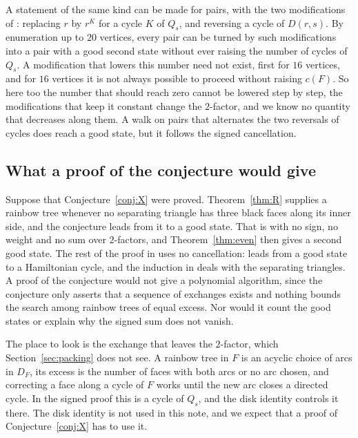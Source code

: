 \documentclass[10pt]{amsart}
\numberwithin{equation}{section}
\theoremstyle{definition}
\theoremstyle{remark}
\begin{document}
A statement of the same kind can be made for pairs, with the two modifications of \cite[Sections~5 and~6]{Paper}: replacing $r$ by $r^K$ for a cycle $K$ of $Q_s$, and reversing a cycle of $D(r,s)$.
By enumeration up to $20$ vertices, every pair can be turned by such modifications into a pair with a good second state without ever raising the number of cycles of $Q_s$.
A modification that lowers this number need not exist, first for $16$ vertices, and for $16$ vertices it is not always possible to proceed without raising $c(F)$.
So here too the number that should reach zero cannot be lowered step by step, the modifications that keep it constant change the $2$-factor, and we know no quantity that decreases along them.
A walk on pairs that alternates the two reversals of cycles does reach a good state, but it follows the signed cancellation.

\subsection*{What a proof of the conjecture would give}
Suppose that Conjecture~\ref{conj:X} were proved.
Theorem~\ref{thm:R} supplies a rainbow tree whenever no separating triangle has three black faces along its inner side, and the conjecture leads from it to a good state.
That is \cite[Proposition~6.9]{Paper} with no sign, no weight and no sum over $2$-factors, and Theorem~\ref{thm:even} then gives a second good state.
The rest of the proof in \cite{Paper} uses no cancellation: \cite[Proposition~3.5]{Paper} leads from a good state to a Hamiltonian cycle, and the induction in \cite[Proposition~2.7]{Paper} deals with the separating triangles.
A proof of the conjecture would not give a polynomial algorithm, since the conjecture only asserts that a sequence of exchanges exists and nothing bounds the search among rainbow trees of equal excess.
Nor would it count the good states or explain why the signed sum does not vanish.

The place to look is the exchange that leaves the $2$-factor, which Section~\ref{sec:packing} does not see.
A rainbow tree in $F$ is an acyclic choice of arcs in $D_F$, its excess is the number of faces with both arcs or no arc chosen, and correcting a face along a cycle of $F$ works until the new arc closes a directed cycle.
In the signed proof this is a cycle of $Q_s$, and the disk identity \cite[Lemma~5.1]{Paper} controls it there.
The disk identity is not used in this note, and we expect that a proof of Conjecture~\ref{conj:X} has to use it.
\end{document}
